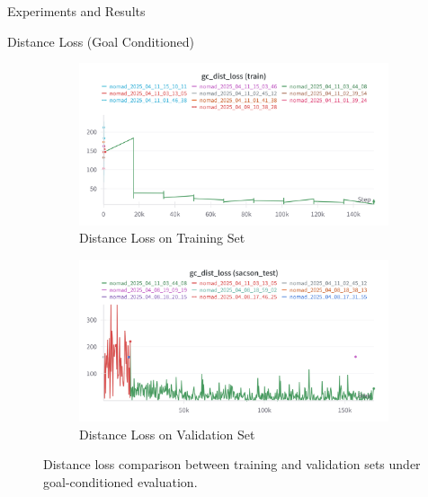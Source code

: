 \documentclass{beamer}
\begin{document}
\begin{frame}{Experiments and Results}
\begin{block}{Distance Loss (Goal Conditioned)}
    \begin{figure}[H]
        \centering
        \begin{subfigure}[b]{0.48\textwidth}
            \includegraphics[width=\textwidth]{images/gc_distloss_nomad.png}
            \caption{Distance Loss on Training Set}
            \label{fig:gc_dist_loss_train}
        \end{subfigure}
        \hfill
        \begin{subfigure}[b]{0.48\textwidth}
            \includegraphics[width=\textwidth]{images/gc_dist_loss_test.png}
            \caption{Distance Loss on Validation Set}
            \label{fig:gc_dist_loss_val}
        \end{subfigure}
        \caption{Distance loss comparison between training and validation sets under goal-conditioned evaluation.}
    \end{figure}
\end{block}
\end{frame}
\end{document}
